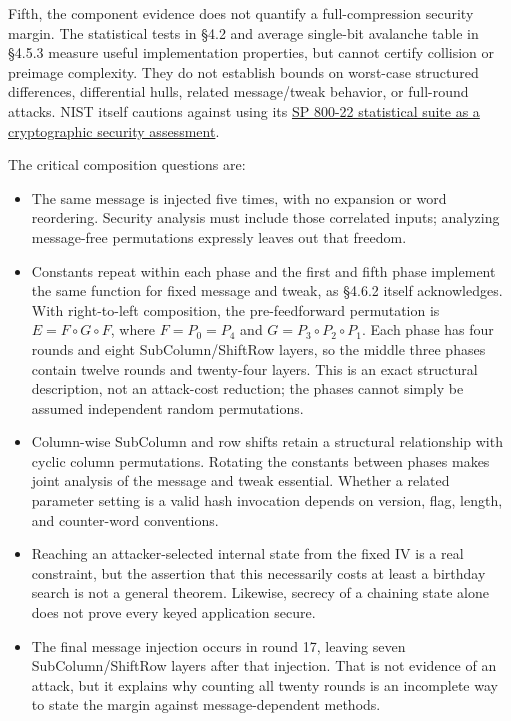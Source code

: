\documentclass[
  english,
  11pt,
  a4paper,
]{article}
\providecommand{\tightlist}{%
  \setlength{\itemsep}{0pt}\setlength{\parskip}{0pt}}
\begin{document}
Fifth, the component evidence does not quantify a full-compression
security margin. The statistical tests in §4.2 and average single-bit
avalanche table in §4.5.3 measure useful implementation properties, but
cannot certify collision or preimage complexity. They do not establish
bounds on worst-case structured differences, differential hulls, related
message/tweak behavior, or full-round attacks. NIST itself cautions
against using its
\href{https://www.nist.gov/news-events/news/2022/04/decision-revise-nist-sp-800-22-rev-1a}{SP
800-22 statistical suite as a cryptographic security assessment}.

The critical composition questions are:

\begin{itemize}
\tightlist
\item
  The same message is injected five times, with no expansion or word
  reordering. Security analysis must include those correlated inputs;
  analyzing message-free permutations expressly leaves out that freedom.
\item
  Constants repeat within each phase and the first and fifth phase
  implement the same function for fixed message and tweak, as §4.6.2
  itself acknowledges. With right-to-left composition, the
  pre-feedforward permutation is \(E=F\circ G\circ F\), where
  \(F=P_0=P_4\) and \(G=P_3\circ P_2\circ P_1\). Each phase has four
  rounds and eight SubColumn/ShiftRow layers, so the middle three phases
  contain twelve rounds and twenty-four layers. This is an exact
  structural description, not an attack-cost reduction; the phases
  cannot simply be assumed independent random permutations.
\item
  Column-wise SubColumn and row shifts retain a structural relationship
  with cyclic column permutations. Rotating the constants between phases
  makes joint analysis of the message and tweak essential. Whether a
  related parameter setting is a valid hash invocation depends on
  version, flag, length, and counter-word conventions.
\item
  Reaching an attacker-selected internal state from the fixed IV is a
  real constraint, but the assertion that this necessarily costs at
  least a birthday search is not a general theorem. Likewise, secrecy of
  a chaining state alone does not prove every keyed application secure.
\item
  The final message injection occurs in round 17, leaving seven
  SubColumn/ShiftRow layers after that injection. That is not evidence
  of an attack, but it explains why counting all twenty rounds is an
  incomplete way to state the margin against message-dependent methods.
\end{itemize}
\end{document}
